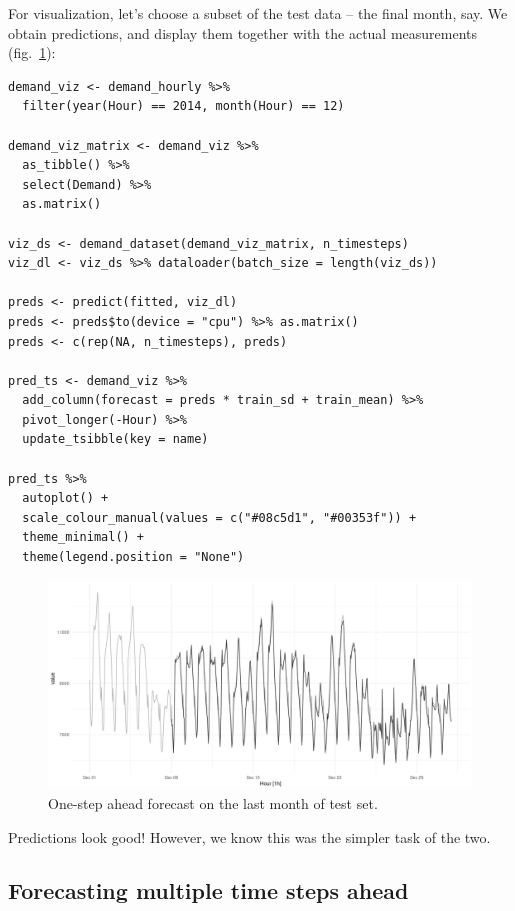 \documentclass[
  letterpaper,
]{krantz}
\begin{document}
For visualization, let's choose a subset of the test data -- the final
month, say. We obtain predictions, and display them together with the
actual measurements (fig.~\ref{fig-timeseries-vic-elec-preds}):

\begin{verbatim}
demand_viz <- demand_hourly %>%
  filter(year(Hour) == 2014, month(Hour) == 12)

demand_viz_matrix <- demand_viz %>%
  as_tibble() %>%
  select(Demand) %>%
  as.matrix()

viz_ds <- demand_dataset(demand_viz_matrix, n_timesteps)
viz_dl <- viz_ds %>% dataloader(batch_size = length(viz_ds))

preds <- predict(fitted, viz_dl)
preds <- preds$to(device = "cpu") %>% as.matrix()
preds <- c(rep(NA, n_timesteps), preds)

pred_ts <- demand_viz %>%
  add_column(forecast = preds * train_sd + train_mean) %>%
  pivot_longer(-Hour) %>%
  update_tsibble(key = name)

pred_ts %>%
  autoplot() +
  scale_colour_manual(values = c("#08c5d1", "#00353f")) +
  theme_minimal() +
  theme(legend.position = "None")
\end{verbatim}

\begin{figure}[H]

{\centering \includegraphics{images/timeseries-vic-elec-preds.png}

}

\caption{\label{fig-timeseries-vic-elec-preds}One-step ahead forecast on
the last month of test set.}

\end{figure}

Predictions look good! However, we know this was the simpler task of the
two.

\hypertarget{forecasting-multiple-time-steps-ahead}{%
\subsection{Forecasting multiple time steps
ahead}\label{forecasting-multiple-time-steps-ahead}}
\end{document}
